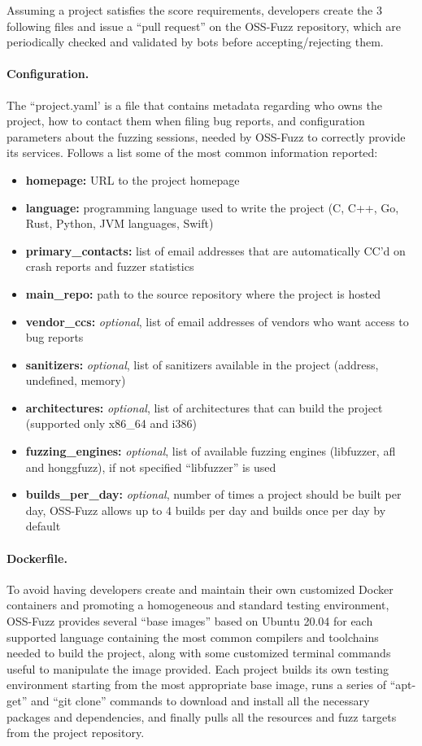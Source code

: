 \newpage
Assuming a project satisfies the score requirements, developers create the 3 following files and issue a ``pull request'' on the OSS-Fuzz repository, which are periodically checked and validated by bots before accepting/rejecting them.

\paragraph{Configuration.} The ``project.yaml' is a file that contains metadata regarding who owns the project, how to contact them when filing bug reports, and configuration parameters about the fuzzing sessions, needed by OSS-Fuzz to correctly provide its services.
Follows a list some of the most common information reported:
\begin{itemize}
    \item \textbf{homepage:} URL to the project homepage
    \item \textbf{language:} programming language used to write the project (C, C++, Go, Rust, Python, JVM languages, Swift)
    \item \textbf{primary\_contacts:} list of email addresses that are automatically CC'd on crash reports and fuzzer statistics
    \item \textbf{main\_repo:} path to the source repository where the project is hosted
    \item \textbf{vendor\_ccs:} \textit{optional}, list of email addresses of vendors who want access to bug reports
    \item \textbf{sanitizers:} \textit{optional}, list of sanitizers available in the project (address, undefined, memory)
    \item \textbf{architectures:} \textit{optional}, list of architectures that can build the project (supported only x86\_64 and i386)
    \item \textbf{fuzzing\_engines:} \textit{optional}, list of available fuzzing engines (libfuzzer, afl and honggfuzz), if not specified ``libfuzzer'' is used
    \item \textbf{builds\_per\_day:} \textit{optional}, number of times a project should be built per day, OSS-Fuzz allows up to 4 builds per day and builds once per day by default
\end{itemize}

\paragraph{Dockerfile.} To avoid having developers create and maintain their own customized Docker containers and promoting a homogeneous and standard testing environment, OSS-Fuzz provides several ``base images'' based on Ubuntu 20.04 for each supported language containing the most common compilers and toolchains needed to build the project, along with some customized terminal commands useful to manipulate the image provided. Each project builds its own testing environment starting from the most appropriate base image, runs a series of ``apt-get'' and ``git clone'' commands to download and install all the necessary packages and dependencies, and finally pulls all the resources and fuzz targets from the project repository.

